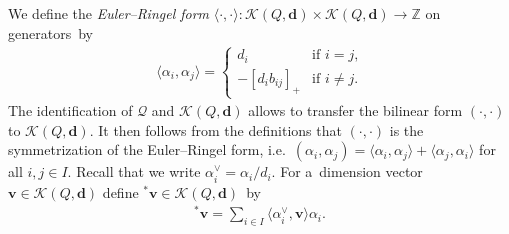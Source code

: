 We def\/ine the \emph{Euler--Ringel form}
$\langle\cdot,\cdot\rangle:
\mathcal{K}(Q,\mathbf{d})\times\mathcal{K}(Q,\mathbf{d})\to\mathbb{Z}$ on generators~by
\begin{gather*}
\langle\alpha_i,\alpha_j\rangle=
\begin{cases}
d_i & \text{if $i=j$,}
\\
-[d_ib_{ij}]_+ & \text{if $i\ne j$.}
\end{cases}
\end{gather*}
The identif\/ication of $\mathcal{Q}$ and $\mathcal{K}(Q,\mathbf{d})$ allows to transfer the bilinear form $(\cdot,\cdot)$
to $\mathcal{K}(Q,\mathbf{d})$.
It then follows from the def\/initions that $(\cdot,\cdot)$ is the symmetrization of the Euler--Ringel form, %
i.e.~$(\alpha_i,\alpha_j)=\langle\alpha_i,\alpha_j\rangle+\langle\alpha_j,\alpha_i\rangle$ for all $i,j\in I$.
Recall that we write $\alpha_i^\vee=\alpha_i/d_i$.
For a~dimension vector $\mathbf{v}\in\mathcal{K}(Q,\mathbf{d})$ def\/ine ${}^*\mathbf{v}\in\mathcal{K}(Q,\mathbf{d})$~by
\begin{gather*}
{}^*\mathbf{v}=\sum\limits_{i\in I}\langle\alpha_i^\vee,\mathbf{v}\rangle\alpha_i.
\end{gather*}
